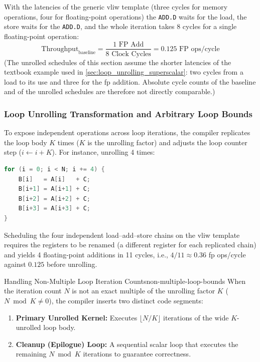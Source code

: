 With the latencies of the generic \gls{vliw} template (three cycles for memory operations, four for floating-point operations) the \texttt{ADD.D} waits for the load, the store waits for the \texttt{ADD.D}, and the whole iteration takes 8 cycles for a single floating-point operation:
\begin{equation}
\text{Throughput}_{\text{baseline}} = \frac{1 \text{ FP Add}}{8 \text{ Clock Cycles}} = 0.125 \text{ FP ops/cycle}
\end{equation}
(The unrolled schedules of this section assume the shorter latencies of the textbook example used in \cref{sec:loop_unrolling_superscalar}: two cycles from a load to its use and three for the \gls{fp} addition. Absolute cycle counts of the baseline and of the unrolled schedules are therefore not directly comparable.)

\subsubsection{Loop Unrolling Transformation and Arbitrary Loop Bounds}
To expose independent operations across loop iterations, the compiler replicates the loop body $K$ times ($K$ is the unrolling factor) and adjusts the loop counter step ($i \leftarrow i + K$). For instance, unrolling 4 times:

\begin{lstlisting}[language=C, caption={Baseline Loop Unrolled 4 Times}]
for (i = 0; i < N; i += 4) {
    B[i]   = A[i]   + C;
    B[i+1] = A[i+1] + C;
    B[i+2] = A[i+2] + C;
    B[i+3] = A[i+3] + C;
}
\end{lstlisting}

Scheduling the four independent load--add--store chains on the \gls{vliw} template requires the registers to be renamed (a different register for each replicated chain) and yields 4 floating-point additions in 11 cycles, i.e., $4/11 \approx 0.36$ \gls{fp} ops/cycle against $0.125$ before unrolling.

\begin{concept}{Handling Non-Multiple Loop Iteration Counts}{non-multiple-loop-bounds}
    When the iteration count $N$ is not an exact multiple of the unrolling factor $K$ ($N \bmod K \neq 0$), the compiler inserts two distinct code segments:
    \begin{enumerate}
        \item \textbf{Primary Unrolled Kernel:} Executes $\lfloor N / K \rfloor$ iterations of the wide $K$-unrolled loop body.
        \item \textbf{Cleanup (Epilogue) Loop:} A sequential scalar loop that executes the remaining $N \bmod K$ iterations to guarantee correctness.
    \end{enumerate}
\end{concept}

